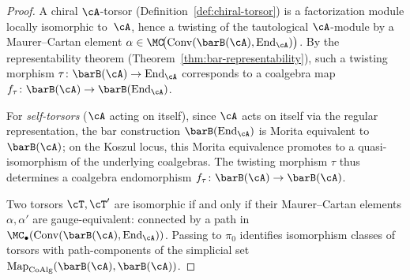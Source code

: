 \begin{proof}
A chiral $\cA$-torsor (Definition~\ref{def:chiral-torsor}) is a
factorization module locally isomorphic to~$\cA$, hence a
twisting of the tautological $\cA$-module by a Maurer--Cartan
element $\alpha \in
\MC\!\bigl(\mathrm{Conv}(\barB(\cA), \mathrm{End}_\cA)\bigr)$.
By the representability theorem
(Theorem~\ref{thm:bar-representability}), such a twisting
morphism $\tau\colon \barB(\cA) \to \mathrm{End}_\cA$ corresponds
to a coalgebra map $f_\tau\colon \barB(\cA) \to
\barB(\mathrm{End}_\cA)$.

For \emph{self-torsors} ($\cA$ acting on itself),
since $\cA$ acts on itself via the regular representation,
the bar construction $\barB(\mathrm{End}_\cA)$ is Morita equivalent
to $\barB(\cA)$; on the Koszul locus, this Morita equivalence
promotes to a quasi-isomorphism of the underlying coalgebras. The twisting
morphism $\tau$ thus determines a coalgebra endomorphism
$f_\tau\colon \barB(\cA) \to \barB(\cA)$.

Two torsors $\cT, \cT'$ are isomorphic if and only if their
Maurer--Cartan elements $\alpha, \alpha'$ are gauge-equivalent:
connected by a path in
$\MC_\bullet(\mathrm{Conv}(\barB(\cA), \mathrm{End}_\cA))$.
Passing to $\pi_0$ identifies isomorphism classes of torsors with
path-components of the simplicial set
$\mathrm{Map}_{\mathrm{CoAlg}}(\barB(\cA), \barB(\cA))$.
\end{proof}

